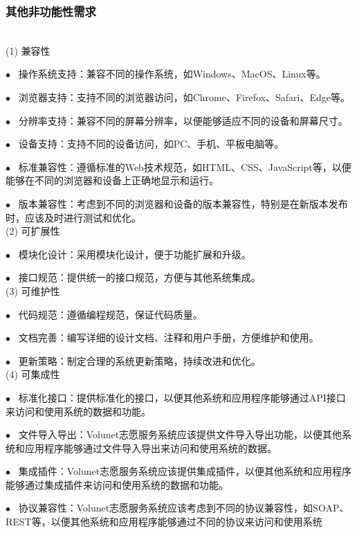 \subsubsection{其他非功能性需求}\\

(1) 兼容性

$\bullet   \enspace$ 操作系统支持：兼容不同的操作系统，如Windows、MacOS、Linux等。
\hfill 

$\bullet   \enspace$ 浏览器支持：支持不同的浏览器访问，如Chrome、Firefox、Safari、Edge等。
\hfill 

$\bullet   \enspace$ 分辨率支持：兼容不同的屏幕分辨率，以便能够适应不同的设备和屏幕尺寸。
\hfill 

$\bullet   \enspace$ 设备支持：支持不同的设备访问，如PC、手机、平板电脑等。
\hfill 

$\bullet   \enspace$ 标准兼容性：遵循标准的Web技术规范，如HTML、CSS、JavaScript等，以便能够在不同的浏览器和设备上正确地显示和运行。
\hfill 

$\bullet   \enspace$ 版本兼容性：考虑到不同的浏览器和设备的版本兼容性，特别是在新版本发布时，应该及时进行测试和优化。
\hfill \\

(2) 可扩展性

$\bullet   \enspace$ 模块化设计：采用模块化设计，便于功能扩展和升级。
\hfill 

$\bullet   \enspace$ 接口规范：提供统一的接口规范，方便与其他系统集成。
\hfill \\

(3) 可维护性

$\bullet   \enspace$ 代码规范：遵循编程规范，保证代码质量。
\hfill 

$\bullet   \enspace$ 文档完善：编写详细的设计文档、注释和用户手册，方便维护和使用。
\hfill 

$\bullet   \enspace$ 更新策略：制定合理的系统更新策略，持续改进和优化。
\hfill \\

(4) 可集成性

$\bullet   \enspace$ 标准化接口：提供标准化的接口，以便其他系统和应用程序能够通过API接口来访问和使用系统的数据和功能。
\hfill 

$\bullet   \enspace$ 文件导入导出：Volunet志愿服务系统应该提供文件导入导出功能，以便其他系统和应用程序能够通过文件导入导出来访问和使用系统的数据。
\hfill 

$\bullet   \enspace$ 集成插件：Volunet志愿服务系统应该提供集成插件，以便其他系统和应用程序能够通过集成插件来访问和使用系统的数据和功能。
\hfill 

$\bullet   \enspace$ 协议兼容性：Volunet志愿服务系统应该考虑到不同的协议兼容性，如SOAP、REST等，以便其他系统和应用程序能够通过不同的协议来访问和使用系统
\hfill 


\newpage